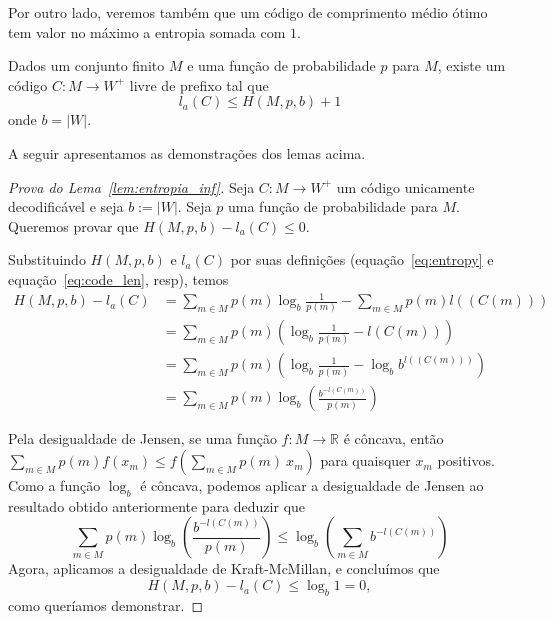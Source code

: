 Por outro lado, veremos também que um código de comprimento médio ótimo tem valor no máximo a entropia somada com $1$.

\begin{lemma}
  \label{lem:entropia_sup}
  Dados um conjunto finito $M$ e uma função de probabilidade $p$ para
  $M$, existe um código $C:M\to W^+$ livre de prefixo tal que
  \begin{equation*}
    l_a(C) \leq H(M, p, b) + 1
  \end{equation*}
  onde $b = |W|$.
\end{lemma}

  A seguir apresentamos as demonstrações dos lemas acima.
  
  \begin{proof}[Prova do Lema~\ref{lem:entropia_inf}]
    Seja $C:M\to W^+$ um código unicamente decodificável e seja $b :=
    |W|$. Seja $p$ uma função de probabilidade para $M$. Queremos
    provar que $H(M, p,b) - l_a(C) \leq 0$.

    Substituindo $H(M,p, b)$ e $l_a(C)$ por suas definições
    (equação~\eqref{eq:entropy} e equação~\eqref{eq:code_len}, resp),
    temos
    \begin{align*}
      H(M, p, b) - l_a(C)
      &=
      \sum_{m \in M} p(m) \log_b \frac{1}{p(m)}
      - \sum_{m \in M}^{}p(m) l((C(m))) \\
      &=
      \sum_{m \in M} p(m) \left(
      \log_b \frac{1}{p(m)} - l(C(m))
      \right) \\
      &=
      \sum_{m \in M} p(m) \left(
      \log_b \frac{1}{p(m)} - \log_b b^{l((C(m)))}
      \right) \\
      &= \sum_{m \in M}^{}p(m) \log_b \left(\frac{b^{-l(C(m))}}{p(m)}\right)
    \end{align*}

    Pela desigualdade de Jensen, se uma função $f:M\to\mathbb{R}$ é
    côncava, então $\sum_{m\in M} p(m) f(x_m) \leq f(\sum_{m\in M}
    p(m)~x_m)$ para quaisquer $x_m$ positivos. Como a função $\log_b$
    é côncava, podemos aplicar a desigualdade de Jensen ao resultado
    obtido anteriormente para deduzir que
\begin{equation*}
  \sum_{m \in M}^{}p(m) \log_b  \left(\frac{b^{-l(C(m))}}{p(m)}\right)
  \leq
  \log_b\left(\sum_{m \in M} b^{-l(C(m))}\right)
\end{equation*}
Agora, aplicamos a desigualdade de Kraft-McMillan, e concluímos que
\begin{equation*}
  H(M, p, b) - l_a(C)
  \leq
  \log_b 1 = 0,
\end{equation*}
como queríamos demonstrar.
\end{proof}


